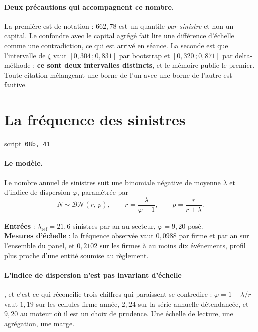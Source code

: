 \documentclass[11pt,a4paper]{article}
\newcommand{\src}[1]{\hfill{\footnotesize\textsf{script~\texttt{#1}}}}
\begin{document}
\paragraph{Deux précautions qui accompagnent ce nombre.} La première est de notation :
$662{,}78$ est un quantile \emph{par sinistre} et non un capital. Le confondre avec le capital
agrégé fait lire une différence d'échelle comme une contradiction, ce qui est arrivé en séance.
La seconde est que l'intervalle de $\xi$ vaut $[0{,}304\,;0{,}831]$ par bootstrap et
$[0{,}320\,;0{,}871]$ par delta-méthode : \textbf{ce sont deux intervalles distincts}, et le
mémoire publie le premier. Toute citation mélangeant une borne de l'un avec une borne de l'autre
est fautive.

\section{La fréquence des sinistres}
\src{\texttt{08b}, \texttt{41}}

\paragraph{Le modèle.} Le nombre annuel de sinistres suit une binomiale négative de moyenne
$\lambda$ et d'indice de dispersion $\varphi$, paramétrée par
\begin{equation}
N \sim \mathcal{BN}(r,\,p), \qquad r = \frac{\lambda}{\varphi - 1},
\qquad p = \frac{r}{r + \lambda}.
\end{equation}

\begin{res}
\textbf{Entrées} : $\lambda_{\text{ref}} = 21{,}6$ sinistres par an au secteur,
$\varphi = 9{,}20$ posé.\\
\textbf{Mesures d'échelle} : la fréquence observée vaut $0{,}0988$ par firme et par an sur
l'ensemble du panel, et $0{,}2102$ sur les firmes à au moins dix événements, profil plus proche
d'une entité soumise au règlement.
\end{res}

\paragraph{L'indice de dispersion n'est pas invariant d'échelle}, et c'est ce qui réconcilie
trois chiffres qui paraissent se contredire : $\varphi = 1 + \lambda/r$ vaut $1{,}19$ sur les
cellules firme-année, $2{,}24$ sur la série annuelle détendancée, et $9{,}20$ au moteur où il est
un choix de prudence. Une échelle de lecture, une agrégation, une marge.
\end{document}
